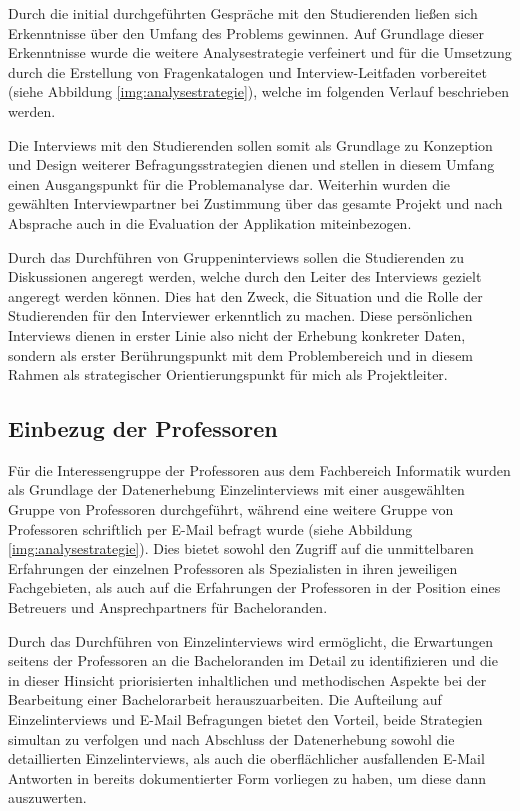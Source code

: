 \documentclass[bibliography=totoc,listof=totoc,BCOR=5mm,DIV=12,oneside]{scrbook}
\begin{document}
\par Durch die initial durchgeführten Gespräche mit den Studierenden ließen sich Erkenntnisse über den Umfang des Problems gewinnen. Auf Grundlage dieser Erkenntnisse wurde die weitere Analysestrategie verfeinert und für die Umsetzung durch die Erstellung von Fragenkatalogen und Interview-Leitfaden vorbereitet (siehe Abbildung \ref{img:analysestrategie}), welche im folgenden Verlauf beschrieben werden.
\par Die Interviews mit den Studierenden sollen somit als Grundlage zu Konzeption und Design weiterer Befragungsstrategien dienen und stellen in diesem Umfang einen Ausgangspunkt für die Problemanalyse dar. Weiterhin wurden die gewählten Interviewpartner bei Zustimmung über das gesamte Projekt und nach Absprache auch in die Evaluation der Applikation miteinbezogen.
\par\medskip Durch das Durchführen von Gruppeninterviews sollen die Studierenden zu Diskussionen angeregt werden, welche durch den Leiter des Interviews gezielt angeregt werden können. Dies hat den Zweck, die Situation und die Rolle der Studierenden für den Interviewer erkenntlich zu machen.  Diese persönlichen Interviews dienen in erster Linie also nicht der Erhebung konkreter Daten, sondern als erster Berührungspunkt mit dem Problembereich und in diesem Rahmen als strategischer Orientierungspunkt für mich als Projektleiter.

\subsection{Einbezug der Professoren}
\par Für die Interessengruppe der Professoren aus dem Fachbereich Informatik wurden als Grundlage der Datenerhebung Einzelinterviews mit einer ausgewählten Gruppe von Professoren durchgeführt, während eine weitere Gruppe von Professoren schriftlich per E-Mail befragt wurde (siehe Abbildung \ref{img:analysestrategie}). Dies bietet sowohl den Zugriff auf die unmittelbaren Erfahrungen der einzelnen Professoren als Spezialisten in ihren jeweiligen Fachgebieten, als auch auf die Erfahrungen der Professoren in der Position eines Betreuers und Ansprechpartners für Bacheloranden. 
\par Durch das Durchführen von Einzelinterviews wird ermöglicht, die Erwartungen seitens der Professoren an die Bacheloranden im Detail zu identifizieren und die in dieser Hinsicht priorisierten inhaltlichen und methodischen Aspekte bei der Bearbeitung einer Bachelorarbeit herauszuarbeiten. Die Aufteilung auf Einzelinterviews und E-Mail Befragungen bietet den Vorteil, beide Strategien simultan zu verfolgen und nach Abschluss der Datenerhebung sowohl die detaillierten Einzelinterviews, als auch die oberflächlicher ausfallenden E-Mail Antworten in bereits dokumentierter Form vorliegen zu haben, um diese dann auszuwerten.
\end{document}
